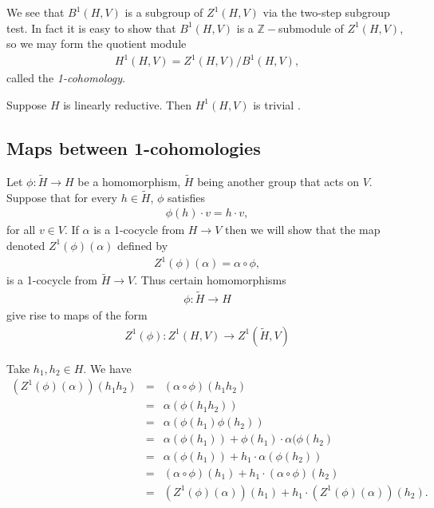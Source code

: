We see that $B^1(H, V)$ is a subgroup of $Z^1(H, V)$ via the two-step subgroup test. In fact it is easy to show that $B^1(H, V)$ is a $\mathbb{Z}-$submodule of $Z^1(H, V)$, so we may form the quotient module
\begin{eqnarray*}
	H^1\left(H, V\right) = Z^1\left(H, V\right) / B^1\left(H, V\right),
\end{eqnarray*}
called the \emph{1-cohomology}.
\begin{lemma} Suppose $H$ is linearly reductive. Then $H^1(H, V)$ is trivial \cite[Proposition 1]{kemper2000characterization}.
  \label{lem:lin_red_h}
\end{lemma}

\subsection{Maps between 1-cohomologies}
Let $\phi:\tilde{H}\rightarrow H$ be a homomorphism, $\tilde{H}$ being another group that acts on $V$. Suppose that for every $h \in \tilde{H}$, $\phi$ satisfies
\begin{eqnarray*}
	\phi(h)\cdot v = h\cdot v,
\end{eqnarray*}
for all $v \in V$. If $\alpha$ is a 1-cocycle from $H\rightarrow V$ then we will show that the map denoted $Z^1(\phi)(\alpha)$ defined by
\begin{eqnarray*}
	Z^1(\phi)(\alpha) = \alpha \circ \phi,
\end{eqnarray*}
is a 1-cocycle from $\tilde{H}\rightarrow V$. Thus certain homomorphisms
\begin{eqnarray*}
	\phi:\tilde{H} \rightarrow H
\end{eqnarray*}
give rise to maps of the form
\begin{eqnarray*}
	Z^1(\phi):Z^1(H, V)\rightarrow Z^1(\tilde{H}, V)
\end{eqnarray*}

Take $h_1, h_2 \in H$. We have
\begin{eqnarray*}
	\left( Z^1(\phi)(\alpha) \right) (h_1h_2) &=& (\alpha \circ \phi)(h_1h_2) \\
		&=& \alpha(\phi(h_1h_2)) \\
		&=& \alpha(\phi(h_1)\phi(h_2)) \\
		&=& \alpha(\phi(h_1)) + \phi(h_1)\cdot\alpha(\phi(h_2) \\
		&=& \alpha(\phi(h_1)) + h_1\cdot\alpha(\phi(h_2)) \\
		&=& (\alpha \circ \phi)(h_1) + h_1 \cdot (\alpha \circ \phi)(h_2) \\
		&=& \left( Z^1(\phi)(\alpha) \right) (h_1) + h_1\cdot \left( Z^1(\phi)(\alpha) \right)(h_2).
\end{eqnarray*}

